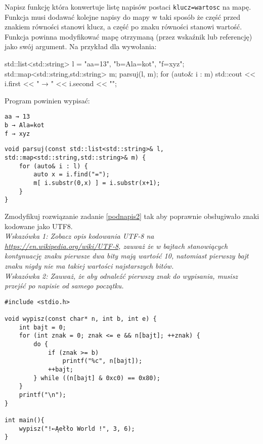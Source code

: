 \dbEntryCheckResults
Napisz funkcję która konwertuje listę napisów postaci \Verb#klucz=wartosc# na mapę.
Funkcja musi dodawać kolejne napisy do mapy w taki sposób że część przed znakiem równości stanowi klucz, a część po znaku równości stanowi wartość.
Funkcja powinna modyfikować mapę otrzymaną (przez wskaźnik lub referencję) jako swój argument. Na przykład dla wywołania:
\begin{CodeFrame*}[cpp]{}
std::list<std::string> l = {"aa=13", "b=Ala=kot", "f=xyz"};
std::map<std::string,std::string> m;
parsuj(l, m);
for (auto& i : m)  std::cout << i.first << " → " << i.second << "\n";
\end{CodeFrame*}
\vspace{-8pt}Program powinien wypisać:
\vspace{-8pt}\begin{Verbatim}
aa → 13
b → Ala=kot
f → xyz
\end{Verbatim}
\fi

\dbEntryCheckResults
\begin{verbatim}
void parsuj(const std::list<std::string>& l, std::map<std::string,std::string>& m) {
	for (auto& i : l) {
		auto x = i.find("=");
		m[ i.substr(0,x) ] = i.substr(x+1);
	}
}
\end{verbatim}
\fi


\dbEntryCheckResults
Zmodyfikuj rozwiązanie zadanie \ref{podnapis2} tak aby poprawnie obsługiwało znaki kodowane jako UTF8.
\\ \textit{
	Wskazówka 1: Zobacz opis kodowania UTF-8 na \url{https://en.wikipedia.org/wiki/UTF-8},
	zauważ że w bajtach stanowiących kontynuację znaku pierwsze dwa bity mają wartość 10,
	natomiast pierwszy bajt znaku nigdy nie ma takiej wartości najstarszych bitów.}
\\ \textit{
	Wskazówka 2: Zauważ, że aby odnaleźć pierwszy znak do wypisania, musisz przejść po napisie od samego początku.}
\fi

\dbEntryCheckResults
\begin{verbatim}
#include <stdio.h>

void wypisz(const char* n, int b, int e) {
	int bajt = 0;
	for (int znak = 0; znak <= e && n[bajt]; ++znak) {
		do {
			if (znak >= b)
				printf("%c", n[bajt]);
			++bajt;
		} while ((n[bajt] & 0xc0) == 0x80);
	}
	printf("\n");
}

int main(){
	wypisz("!←Ąełło World !", 3, 6);
}
\end{verbatim}
\fi
